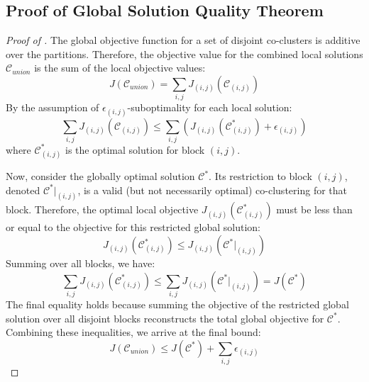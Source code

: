 \documentclass[journal]{IEEEtran}
\theoremstyle{definition}
\theoremstyle{remark} %
\begin{document}
\subsection{Proof of Global Solution Quality Theorem}
\label{appendix:proof-global-solution-quality}

\begin{proof}[Proof of ]
    The global objective function for a set of disjoint co-clusters is additive over the partitions. Therefore, the objective value for the combined local solutions $\mathcal{C}_{union}$ is the sum of the local objective values:
    \begin{equation}
        J(\mathcal{C}_{union}) = \sum_{i,j} J_{(i,j)}(\mathcal{C}_{(i,j)})
    \end{equation}
    By the assumption of $\epsilon_{(i,j)}$-suboptimality for each local solution:
    \begin{equation}
        \sum_{i,j} J_{(i,j)}(\mathcal{C}_{(i,j)}) \le \sum_{i,j} \left( J_{(i,j)}(\mathcal{C}_{(i,j)}^*) + \epsilon_{(i,j)} \right)
    \end{equation}
    where $\mathcal{C}_{(i,j)}^*$ is the optimal solution for block $(i,j)$.

    Now, consider the globally optimal solution $\mathcal{C}^*$. Its restriction to block $(i,j)$, denoted $\mathcal{C}^*|_{(i,j)}$, is a valid (but not necessarily optimal) co-clustering for that block. Therefore, the optimal local objective $J_{(i,j)}(\mathcal{C}_{(i,j)}^*)$ must be less than or equal to the objective for this restricted global solution:
    \begin{equation}
        J_{(i,j)}(\mathcal{C}_{(i,j)}^*) \le J_{(i,j)}(\mathcal{C}^*|_{(i,j)})
    \end{equation}
    Summing over all blocks, we have:
    \begin{equation}
        \sum_{i,j} J_{(i,j)}(\mathcal{C}_{(i,j)}^*) \le \sum_{i,j} J_{(i,j)}(\mathcal{C}^*|_{(i,j)}) = J(\mathcal{C}^*)
    \end{equation}
    The final equality holds because summing the objective of the restricted global solution over all disjoint blocks reconstructs the total global objective for $\mathcal{C}^*$. Combining these inequalities, we arrive at the final bound:
    \begin{equation}
        J(\mathcal{C}_{union}) \le J(\mathcal{C}^*) + \sum_{i,j} \epsilon_{(i,j)}
    \end{equation}
\end{proof}
\end{document}
